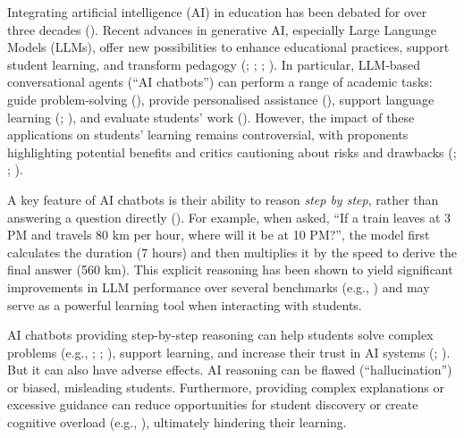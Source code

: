 \documentclass[
  11pt,
]{article}
\begin{document}
Integrating artificial intelligence (AI) in education has been debated for over three decades (). Recent advances in generative AI, especially Large Language Models (LLMs), offer new possibilities to enhance educational practices, support student learning, and transform pedagogy (; ; ; ). In particular, LLM-based conversational agents (``AI chatbots'') can perform a range of academic tasks: guide problem-solving (), provide personalised assistance (), support language learning (; ), and evaluate students' work (). However, the impact of these applications on students' learning remains controversial, with proponents highlighting potential benefits and critics cautioning about risks and drawbacks (; ; ).

A key feature of AI chatbots is their ability to reason \emph{step by step}, rather than answering a question directly (). For example, when asked, ``If a train leaves at 3 PM and travels 80 km per hour, where will it be at 10 PM?'', the model first calculates the duration (7 hours) and then multiplies it by the speed to derive the final answer (560 km). This explicit reasoning has been shown to yield significant improvements in LLM performance over several benchmarks (e.g., ) and may serve as a powerful learning tool when interacting with students.

AI chatbots providing step-by-step reasoning can help students solve complex problems (e.g., ; ; ), support learning, and increase their trust in AI systems (; ). But it can also have adverse effects. AI reasoning can be flawed (``hallucination'') or biased, misleading students. Furthermore, providing complex explanations or excessive guidance can reduce opportunities for student discovery or create cognitive overload (e.g., ), ultimately hindering their learning.
\end{document}
